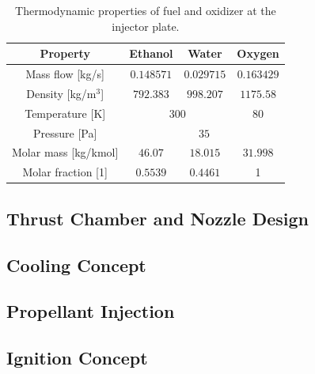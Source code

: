         
        \begin{table}
            \centering
            \bgroup
            \def\arraystretch{1.5}
            \begin{tabular}{|c||c|c||c|}
                \hline
                 Property & Ethanol & Water & Oxygen\\
                 \hline
                 \hline
                 Mass flow [kg/s]& $0.148571$ & $0.029715$ & $0.163429$\\
                 \hline
                 Density [kg/m$^3$]& $792.383$ & $998.207$ & $1175.58$\\
                 \hline
                 Temperature [K]&\multicolumn{2}{c||}{$300$}& $80$\\
                 \hline
                 Pressure [Pa]& \multicolumn{3}{c|}{$35$}\\
                 \hline
                 Molar mass [kg/kmol]& $46.07$ & $18.015$ & $31.998$\\
                 \hline
                 Molar fraction [1]& $0.5539$ & $0.4461$ & 1\\
                 \hline
            \end{tabular}
            \egroup
            \caption{Thermodynamic properties of fuel and oxidizer at the injector plate.}
            \label{tab:therm.prop.inj.}
        \end{table}

    \subsection{Thrust Chamber and Nozzle Design}


    \subsection{Cooling Concept}


    \subsection{Propellant Injection}


    \subsection{Ignition Concept}
